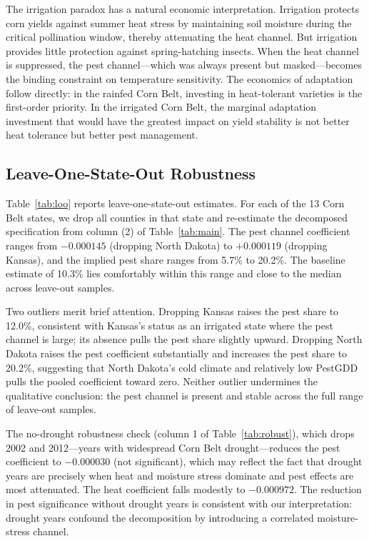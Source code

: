 \documentclass[12pt]{article}
\begin{document}
The irrigation paradox has a natural economic interpretation. Irrigation protects corn yields against summer heat stress by maintaining soil moisture during the critical pollination window, thereby attenuating the heat channel. But irrigation provides little protection against spring-hatching insects. When the heat channel is suppressed, the pest channel---which was always present but masked---becomes the binding constraint on temperature sensitivity. The economics of adaptation follow directly: in the rainfed Corn Belt, investing in heat-tolerant varieties is the first-order priority. In the irrigated Corn Belt, the marginal adaptation investment that would have the greatest impact on yield stability is not better heat tolerance but better pest management.

\subsection{Leave-One-State-Out Robustness}

Table~\ref{tab:loo} reports leave-one-state-out estimates. For each of the 13 Corn Belt states, we drop all counties in that state and re-estimate the decomposed specification from column (2) of Table~\ref{tab:main}. The pest channel coefficient ranges from $-0.000145$ (dropping North Dakota) to $+0.000119$ (dropping Kansas), and the implied pest share ranges from 5.7\% to 20.2\%. The baseline estimate of 10.3\% lies comfortably within this range and close to the median across leave-out samples.



Two outliers merit brief attention. Dropping Kansas raises the pest share to 12.0\%, consistent with Kansas's status as an irrigated state where the pest channel is large; its absence pulls the pest share slightly upward. Dropping North Dakota raises the pest coefficient substantially and increases the pest share to 20.2\%, suggesting that North Dakota's cold climate and relatively low PestGDD pulls the pooled coefficient toward zero. Neither outlier undermines the qualitative conclusion: the pest channel is present and stable across the full range of leave-out samples.

The no-drought robustness check (column 1 of Table~\ref{tab:robust}), which drops 2002 and 2012---years with widespread Corn Belt drought---reduces the pest coefficient to $-0.000030$ (not significant), which may reflect the fact that drought years are precisely when heat and moisture stress dominate and pest effects are most attenuated. The heat coefficient falls modestly to $-0.000972$. The reduction in pest significance without drought years is consistent with our interpretation: drought years confound the decomposition by introducing a correlated moisture-stress channel.
\end{document}
